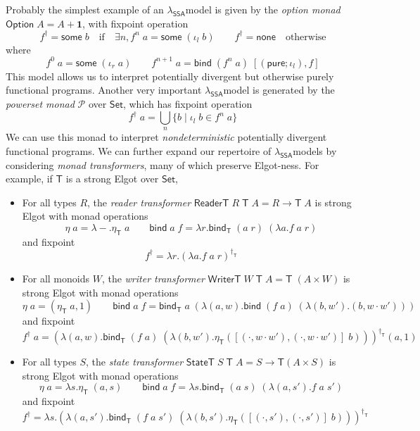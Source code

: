 \documentclass[acmsmall,screen,review]{acmart}
\newcommand{\mc}[1]{\ensuremath{\mathcal{#1}}}
\newcommand{\mb}[1]{\ensuremath{\mathbf{#1}}}
\newcommand{\ms}[1]{\ensuremath{\mathsf{#1}}}
\newcommand{\isotopessa}{\(\lambda_{\ms{SSA}}\)}
\begin{document}
Probably the simplest example of an \isotopessa model is given by the
\emph{option monad} $\ms{Option}\;A = A + \mb{1}$, with fixpoint operation
$$
  f^\dagger = \ms{some}\;b \quad \text{if} \quad \exists n, f^n\;a = \ms{some}\;(\iota_l\;b)
  \qquad
  f^\dagger = \ms{none} \quad \text{otherwise}
$$
where
$$
  f^0\;a = \ms{some}\;(\iota_r\;a) \qquad
  f^{n + 1}\;a = \ms{bind}\;(f^{n}\;a)\;[(\ms{pure};\iota_l), f] 
$$
This model allows us to interpret potentially divergent but otherwise purely functional programs.
Another very important \isotopessa model is generated by the \emph{powerset monad} $\mc{P}$ over
\ms{Set}, which has fixpoint operation
$$
  f^\dagger\;a = \bigcup_n\{b \mid \iota_l\;b \in f^n\;a\}
$$
We can use this monad to interpret \emph{nondeterministic} potentially divergent functional
programs. We can further expand our repertoire of \isotopessa models by considering \emph{monad
transformers}, many of which preserve Elgot-ness. For example, if $\ms{T}$ is a strong Elgot over
\ms{Set},
\begin{itemize}
  \item For all types $R$, the \emph{reader transformer}
  $\ms{ReaderT}\;R\;\ms{T}\;A = R \to \ms{T}\;A$ is strong Elgot 
  with monad operations
  \begin{equation}
    \eta\;a = \lambda - . \eta_{\ms{T}}\;a \qquad
    \ms{bind}\;a\;f = \lambda r. \ms{bind}_{\ms{T}}\;(a\;r)\;(\lambda a. f\;a\;r)
  \end{equation}
  and fixpoint
  \begin{equation}
    f^\dagger = \lambda r.(\lambda a. f\;a\;r)^{\dagger_{\ms{T}}} 
  \end{equation}
  \item For all monoids $W$, the \emph{writer transformer}
  $\ms{WriterT}\;W\;\ms{T}\;A = \ms{T}\;(A \times W)$ is strong Elgot 
  with monad operations
  \begin{equation}
    \eta\;a = (\eta_{\ms{T}}\;a, 1) \qquad
    \ms{bind}\;a\;f = \ms{bind}_{\ms{T}}\;a\;(\lambda (a, w). 
      \ms{bind}\;(f\;a)\;(\lambda (b, w') . (b, w \cdot w')))
  \end{equation}
  and fixpoint
  \begin{equation}
    f^\dagger\;a = (
        \lambda (a, w). \ms{bind}_{\ms{T}}\;(f\;a)\;
          (\lambda (b, w') . \eta_{\ms{T}}([(\cdot, w \cdot w'), (\cdot, w \cdot w')]\;b))
      )^{\dagger_{\ms{T}}}
      (a, 1)
  \end{equation}
  \item For all types $S$, the \emph{state transformer}
  $\ms{StateT}\;S\;\ms{T}\;A = S \to \ms{T}(A \times S)$ is strong Elgot 
  with monad operations
  \begin{equation}
    \eta\;a = \lambda s. \eta_{\ms{T}}\;(a, s) \qquad
    \ms{bind}\;a\;f = \lambda s. \ms{bind}_{\ms{T}}\;(a\;s)\;(\lambda (a, s'). f\;a\;s')
  \end{equation}
  and fixpoint
  \begin{equation}
    f^\dagger = \lambda s.(\lambda (a, s'). 
      \ms{bind}_{\ms{T}}\;(f\;a\;s')\;(\lambda (b, s') . 
        \eta_{\ms{T}}([(\cdot, s'), (\cdot, s')]\;b)))^{\dagger_{\ms{T}}}
  \end{equation}
\end{itemize}
\end{document}
